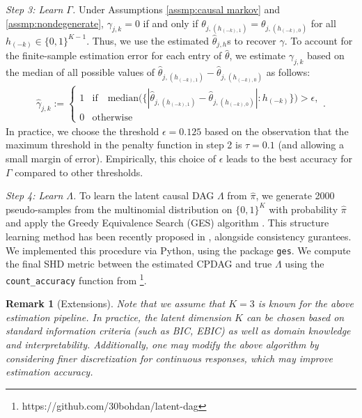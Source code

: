 \documentclass[10pt]{article} %
\newtheorem{remark}{Remark}
\def\hat{\widehat}
\begin{document}
\emph{Step 3: Learn $\Gamma$.} Under Assumptions \ref{assmp:causal markov} and \ref{assmp:nondegenerate}, $\gamma_{j,k} = 0$ if and only if $\theta_{j, (h_{(-k),1})} = \theta_{j, (h_{(-k),0})}$ for all $h_{(-k)} \in \{0,1\}^{K-1}$. Thus, we use the estimated $\hat{\theta}_{j,h}$s to recover $\gamma$. To account for the finite-sample estimation error for each entry of $\hat{\theta}$, we estimate $\gamma_{j,k}$ based on the median of all possible values of $\hat{\theta}_{j, (h_{(-k),1})} - \hat{\theta}_{j, (h_{(-k),0})}$ as follows:
\begin{align}\label{eq:estimate gamma}
    \hat{\gamma}_{j,k} := \begin{cases}
        1 & \text{if} \quad \text{median}\big(\{|\hat{\theta}_{j, (h_{(-k),1})} - \hat{\theta}_{j, (h_{(-k),0})}| :h_{(-k)}\} \big) > \epsilon, \\
        0 & \text{otherwise}
    \end{cases}.
\end{align}
In practice, we choose the threshold $\epsilon = 0.125$ based on the observation that the maximum threshold in the penalty function in step 2 is $\tau = 0.1$ (and allowing a small margin of error). Empirically, this choice of $\epsilon$ leads to the best accuracy for $\Gamma$ compared to other thresholds.

\emph{Step 4: Learn $\Lambda$.} To learn the latent causal DAG $\Lambda$ from $\hat{\pi}$, we generate 2000 pseudo-samples from the multinomial distribution on $\{0,1\}^K$ with probability $\hat{\pi}$ and apply the Greedy Equivalence Search (GES) algorithm \citep{chickering2002optimal}. 
{This structure learning method has been recently proposed in \cite{zhang2025causalrep}, alongside consistency gurantees.}
We implemented this procedure via Python, using the package \texttt{ges}. We compute the final SHD metric between the estimated CPDAG and true $\Lambda$ using the \texttt{count\_accuracy} function from \cite{kivva2021learning}\footnote{https://github.com/30bohdan/latent-dag}.

\begin{remark}[Extensions]
Note that we assume that $K = 3$ is known for the above estimation pipeline. In practice, the latent dimension $K$ can be chosen based on standard information criteria (such as BIC, EBIC) as well as domain knowledge and interpretability. Additionally, one may modify the above algorithm by considering finer discretization for continuous responses, which may improve estimation accuracy.
\end{remark}
\end{document}
